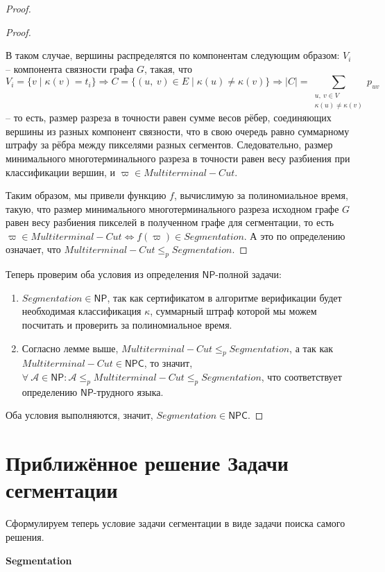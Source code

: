 \documentclass[a4paper,12pt]{article}
\newcommand{\NPclass}{\mathsf{NP}}
\newcommand{\NPCclass}{\mathsf{NPC}}
\begin{document}
\begin{proof}
\begin{proof}
\begin{itemize}
            В таком случае, вершины распределятся по компонентам следующим образом: $V_i$ -- компонента связности графа $G$, такая, что 
            \[V_i = \{v\mid \kappa(v) = t_i\} \Longrightarrow C = \{(u,\ v) \in E \mid \kappa(u) \neq \kappa(v)\} \Longrightarrow |C| = \displaystyle\sum\limits_{\substack{u,\ v \in V\\\kappa(u) \neq \kappa(v)}}p_{uv}\] -- то есть, размер разреза в точности равен сумме весов рёбер, соединяющих вершины из разных компонент связности, что в свою очередь равно суммарному штрафу за рёбра между пикселями разных сегментов. Следовательно, размер минимального многотерминального разреза в точности равен весу разбиения при классификации вершин, и $\varpi \in Multiterminal-Cut$.
        \end{itemize}
        Таким образом, мы привели функцию $f$, вычислимую за полиномиальное время, такую, что размер минимального многотерминального разреза исходном графе $G$ равен весу разбиения пикселей в полученном графе для сегментации, то есть\\ $\varpi \in Multiterminal-Cut \Longleftrightarrow f(\varpi) \in Segmentation$. А это по определению означает, что $Multiterminal-Cut \leqslant_p Segmentation$.
    \end{proof}
    Теперь проверим оба условия из определения $\NPclass$-полной задачи:
    \begin{enumerate}
        \item $Segmentation \in \NPclass$, так как сертификатом в алгоритме верификации будет необходимая классификация $\kappa$, суммарный штраф которой мы можем посчитать и проверить за полиномиальное время.
        \item Согласно лемме выше, $Multiterminal-Cut \leqslant_p Segmentation$, а так как $Multiterminal-Cut \in \NPCclass$, то значит, $\forall\ \mathscr{A} \in \NPclass: \mathscr{A} \leqslant_p Multiterminal-Cut \leqslant_p Segmentation$, что соответствует определению $\NPclass$-трудного языка.
    \end{enumerate}
    Оба условия выполняются, значит, $Segmentation\in \NPCclass$.
\end{proof}

\newpage
\section{Приближённое решение Задачи сегментации}
Сформулируем теперь условие задачи сегментации в виде задачи поиска самого решения.

\textbf{Segmentation}
\begin{algorithmic}
\end{algorithmic}
\end{document}
